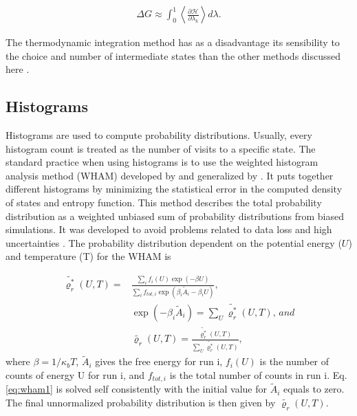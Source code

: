 \begin{equation}
\label{eq:ti4}
\begin{aligned}
\Delta G \approx \int _{0}^{1}  \left \langle \frac{\partial \mathcal{H}}{\partial \lambda _{k}}  \right \rangle d \lambda .
\end{aligned}
\end{equation}

The thermodynamic integration method has as a disadvantage its sensibility to the choice and number of intermediate states than the other methods discussed here \cite{doi:10.1002/jcc.23229}. 

\subsection{Histograms}
Histograms are used to compute probability distributions. Usually, every histogram count is treated as the number of visits to a specific state. The standard practice when using histograms is to use the weighted histogram analysis method (WHAM) developed by  and generalized by  \cite{freeenergy}. It puts together different histograms by minimizing the statistical error in the computed density of states and entropy function. This method describes the total probability distribution as a weighted unbiased sum of probability distributions from biased simulations. It was developed to avoid problems related to data loss and high uncertainties \cite{ROUX1995275}. The probability distribution dependent on the potential energy ($U$) and temperature (T)  for the WHAM is

\begin{equation}
\label{eq:wham1}
\begin{aligned}
\tilde{\varrho_{r}^{*}}(U,T)  {}=& \frac{\sum_{i} f_{i}(U) \exp(- \beta U)}{\sum_{i} f_{tot,i} \exp(\beta _{i} \tilde{A}_{i} -\beta _{i} U) }, \\
& \exp(- \beta _{i} \tilde{A}_{i})  = \sum_{U} \tilde{\varrho_{r}^{*}}(U,T), \, and \\
& \tilde{\varrho_{r}}(U,T) = \frac{\tilde{\varrho_{r}^{*}}(U,T)}{\sum_{U} \tilde{\varrho_{r}^{*}}(U,T)},
\end{aligned}
\end{equation}
where $\beta = 1/\kappa_{b}T$, $\tilde{A}_{i}$ gives the free energy for run i, $f_{i}(U)$ is the number of counts of energy U for run i, and $f_{tot,i}$ is the total number of counts in run i. Eq. \eqref{eq:wham1} is solved self consistently with the initial value for $\tilde{A}_{i}$ equals to zero. The final unnormalized probability distribution is then given by $\tilde{\varrho_{r}}(U,T)$.

